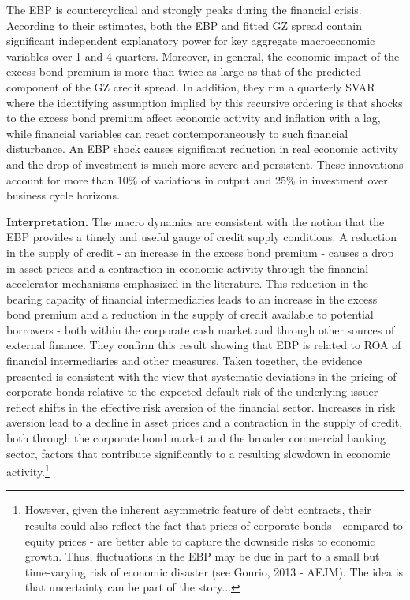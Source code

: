 \documentclass{article}
\begin{document}
{The EBP is countercyclical and strongly peaks during the financial crisis. According to their estimates, both the EBP and fitted GZ spread contain significant independent explanatory power for key aggregate macroeconomic variables over 1 and 4 quarters. Moreover, in general, the economic impact of the excess bond premium is more than twice as large as that of the predicted component of the GZ credit spread. In addition, they run a quarterly SVAR where the identifying assumption implied by this recursive ordering is that shocks to the excess bond premium affect economic activity and inflation with a lag, while financial variables can react contemporaneously to such financial disturbance. An EBP shock causes significant reduction in real economic activity and the drop of investment is much more severe and persistent. These innovations account for more than 10\% of variations in output and 25\% in investment over business cycle horizons.

\textbf{Interpretation.} The macro dynamics are consistent with the notion that the EBP provides a timely and useful gauge of credit supply conditions. A reduction in the supply of credit - an increase in the excess bond premium - causes a drop in asset prices and a contraction in economic activity through the financial accelerator mechanisms emphasized in the literature. This reduction in the bearing capacity of financial intermediaries leads to an increase in the excess bond premium and a reduction in the supply of credit available to potential borrowers - both within the corporate cash market and through other sources of external finance. They confirm this result showing that EBP is related to ROA of financial intermediaries and other measures. Taken together, the evidence presented is consistent with the view that systematic deviations in the pricing of corporate bonds relative to the expected default risk of the underlying issuer reflect shifts in the effective risk aversion of the financial sector. Increases in risk aversion lead to a decline in asset prices and a contraction in the supply of credit, both through the corporate bond market and the broader commercial banking sector, factors that contribute significantly to a resulting slowdown in economic activity.\footnote{However, given the inherent asymmetric feature of debt contracts, their results could also reflect the fact that prices of corporate bonds - compared to equity prices - are better able to capture the downside risks to economic growth. Thus, fluctuations in the EBP may be due in part to a small but time-varying risk of economic disaster (see Gourio, 2013 - AEJM). The idea is that uncertainty can be part of the story...}





}
\end{document}
